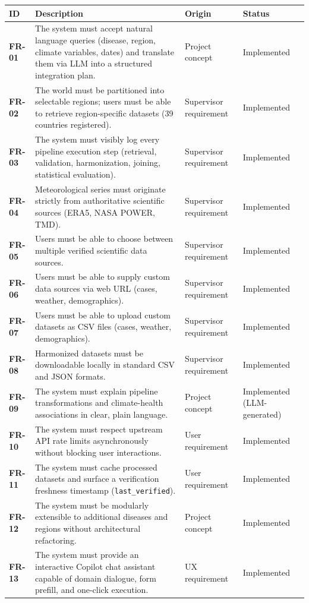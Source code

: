 \documentclass[11pt,a4paper]{article}
\begin{document}
\begin{longtable}{@{}>{\bfseries}p{1.6cm} L{7.4cm} L{3.6cm} L{2.4cm}@{}}
\toprule
ID & Description & Origin & Status \\
\midrule
\endhead
FR-01 & The system must accept natural language queries (disease, region, climate variables, dates) and translate them via LLM into a structured integration plan. & Project concept & Implemented \\
FR-02 & The world must be partitioned into selectable regions; users must be able to retrieve region-specific datasets (39 countries registered). & Supervisor requirement & Implemented \\
FR-03 & The system must visibly log every pipeline execution step (retrieval, validation, harmonization, joining, statistical evaluation). & Supervisor requirement & Implemented \\
FR-04 & Meteorological series must originate strictly from authoritative scientific sources (ERA5, NASA POWER, TMD). & Supervisor requirement & Implemented \\
FR-05 & Users must be able to choose between multiple verified scientific data sources. & Supervisor requirement & Implemented \\
FR-06 & Users must be able to supply custom data sources via web URL (cases, weather, demographics). & Supervisor requirement & Implemented \\
FR-07 & Users must be able to upload custom datasets as CSV files (cases, weather, demographics). & Supervisor requirement & Implemented \\
FR-08 & Harmonized datasets must be downloadable locally in standard CSV and JSON formats. & Supervisor requirement & Implemented \\
FR-09 & The system must explain pipeline transformations and climate-health associations in clear, plain language. & Project concept & Implemented (LLM-generated) \\
FR-10 & The system must respect upstream API rate limits asynchronously without blocking user interactions. & User requirement & Implemented \\
FR-11 & The system must cache processed datasets and surface a verification freshness timestamp (\texttt{last\_verified}). & User requirement & Implemented \\
FR-12 & The system must be modularly extensible to additional diseases and regions without architectural refactoring. & Project concept & Implemented \\
FR-13 & The system must provide an interactive Copilot chat assistant capable of domain dialogue, form prefill, and one-click execution. & UX requirement & Implemented \\

\end{longtable}
\end{document}
